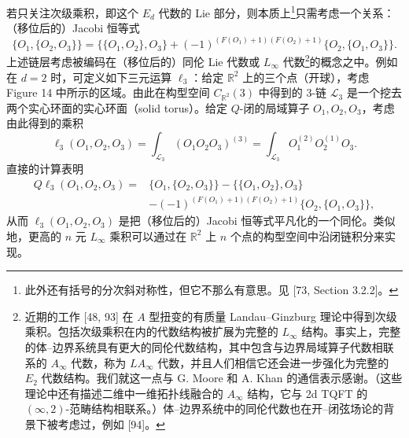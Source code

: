 若只关注次级乘积，即这个 $E_d$ 代数的 Lie 部分，则本质上\footnote{此外还有括号的分次斜对称性，但它不那么有意思。见 [73, Section 3.2.2]。}只需考虑一个关系：（移位后的）Jacobi 恒等式
\begin{equation}
  \tag{3.56}
  \{O_1,\{O_2,O_3\}\}=\{\{O_1,O_2\},O_3\}+(-1)^{(F(O_1)+1)(F(O_2)+1)}\{O_2,\{O_1,O_3\}\}.
\end{equation}
上述链层考虑被编码在（移位后的）同伦 Lie 代数或 $L_\infty$ 代数\footnote{近期的工作 [48, 93] 在 $A$ 型扭变的有质量 Landau–Ginzburg 理论中得到次级乘积。包括次级乘积在内的代数结构被扩展为完整的 $L_\infty$ 结构。事实上，完整的体–边界系统具有更大的同伦代数结构，其中包含与边界局域算子代数相联系的 $A_\infty$ 代数，称为 $LA_\infty$ 代数，并且人们相信它还会进一步强化为完整的 $E_2$ 代数结构。我们就这一点与 G. Moore 和 A. Khan 的通信表示感谢。（这些理论中还有描述二维中一维拓扑线融合的 $A_\infty$ 结构，它与 2d TQFT 的 $(\infty,2)$-范畴结构相联系。）体–边界系统中的同伦代数也在开–闭弦场论的背景下被考虑过，例如 [94]。}的概念之中。例如在 $d=2$ 时，可定义如下三元运算 $\ell_3$：给定 $\mathbb{R}^2$ 上的三个点（开球），考虑 Figure 14 中所示的区域。由此在构型空间 $C_{\mathbb{R}^2}(3)$ 中得到的 $3$-链 $\mathcal{L}_3$ 是一个挖去两个实心环面的实心环面（solid torus）。给定 $Q$-闭的局域算子 $O_1,O_2,O_3$，考虑由此得到的乘积
\begin{equation}
  \tag{3.57}
  \ell_3(O_1,O_2,O_3)=\int_{\mathcal{L}_3}(O_1O_2O_3)^{(3)}=\int_{\mathcal{L}_3}O_1^{(2)}O_2^{(1)}O_3.
\end{equation}
直接的计算表明
\begin{equation}
  \tag{3.58}
  \begin{aligned}
  Q\ell_3(O_1,O_2,O_3)={}&\{O_1,\{O_2,O_3\}\}-\{\{O_1,O_2\},O_3\}\\
  &-(-1)^{(F(O_1)+1)(F(O_2)+1)}\{O_2,\{O_1,O_3\}\},
  \end{aligned}
\end{equation}
从而 $\ell_3(O_1,O_2,O_3)$ 是把（移位后的）Jacobi 恒等式平凡化的一个同伦。类似地，更高的 $n$ 元 $L_\infty$ 乘积可以通过在 $\mathbb{R}^2$ 上 $n$ 个点的构型空间中沿闭链积分来实现。

